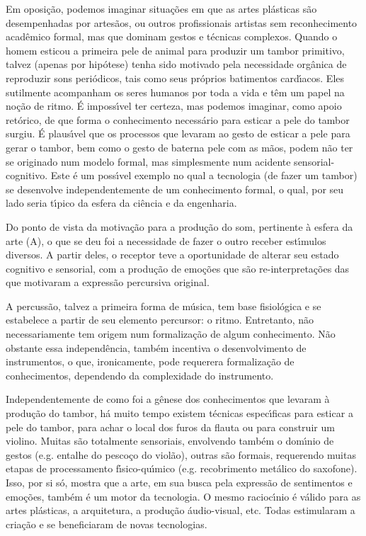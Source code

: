 \documentclass[
12pt,		%
openright,	%
twoside,  %
a4paper,			%
chapter=TITLE,		%
english,			%
french,				%
spanish,			%
brazil				%
]{USPSC-classe/USPSC}
\begin{document}
Em oposi\c{c}\~ao, podemos imaginar situa\c{c}\~oes em que as artes pl\'asticas s\~ao desempenhadas por artes\~aos, ou outros profissionais artistas sem reconhecimento acad\^emico formal, mas que dominam gestos e t\'ecnicas complexos. Quando o homem esticou a primeira pele de animal para produzir um tambor primitivo, talvez (apenas por hip\'otese) tenha sido motivado pela necessidade org\^anica de reproduzir sons peri\'odicos, tais como seus pr\'oprios batimentos card\'{\i}acos. Eles sutilmente acompanham os seres humanos por toda a vida e t\^em um papel na no\c{c}\~ao de ritmo. \'E imposs\'{\i}vel ter certeza, mas podemos imaginar, como apoio ret\'orico, de que forma o conhecimento necess\'ario para esticar a pele do tambor surgiu. \'E plaus\'{\i}vel que os processos que levaram ao gesto de esticar a pele para gerar o tambor, bem como o gesto de \textquotedbl bater\textquotedbl  na pele com as m\~aos, podem n\~ao ter se originado num modelo formal, mas simplesmente num acidente sensorial-cognitivo. Este \'e um poss\'{\i}vel exemplo no qual a tecnologia (de fazer um tambor) se desenvolve independentemente de um conhecimento formal, o qual, por seu lado seria t\'{\i}pico da esfera da ci\^encia e da engenharia.




Do ponto de vista da motiva\c{c}\~ao para a produ\c{c}\~ao do som, pertinente \`a esfera da arte (A), o que se deu foi a necessidade de fazer o outro receber est\'{\i}mulos diversos. A partir deles, o receptor teve a oportunidade de alterar seu estado cognitivo e sensorial, com a produ\c{c}\~ao de emo\c{c}\~oes que s\~ao re-interpreta\c{c}\~oes das que motivaram a express\~ao percursiva original.




A percuss\~ao, talvez a primeira forma de m\'usica, tem base fisiol\'ogica e se estabelece a partir de seu elemento percursor: o ritmo. Entretanto, n\~ao necessariamente tem origem num formaliza\c{c}\~ao de algum conhecimento. N\~ao obstante essa independ\^encia, tamb\'em incentiva o desenvolvimento de instrumentos, o que, ironicamente, pode requerera formaliza\c{c}\~ao de conhecimentos, dependendo da complexidade do instrumento.




Independentemente de como foi a g\^enese dos conhecimentos que levaram \`a produ\c{c}\~ao do tambor, h\'a muito tempo existem t\'ecnicas espec\'{\i}ficas para esticar a pele do tambor, para achar o local dos furos da flauta ou para construir um violino. Muitas s\~ao totalmente sensoriais, envolvendo tamb\'em o dom\'{\i}nio de gestos (e.g. entalhe do pesco\c{c}o do viol\~ao), outras s\~ao formais, requerendo muitas etapas de processamento f\'{\i}sico-qu\'{\i}mico (e.g. recobrimento met\'alico do saxofone). Isso, por si s\'o, mostra que a arte, em sua busca pela express\~ao de sentimentos e emo\c{c}\~oes, tamb\'em \'e um motor da tecnologia. O mesmo racioc\'{\i}nio \'e v\'alido para as artes pl\'asticas, a arquitetura, a produ\c{c}\~ao \'audio-visual, etc. Todas estimularam a cria\c{c}\~ao e se beneficiaram de novas tecnologias.
\end{document}

